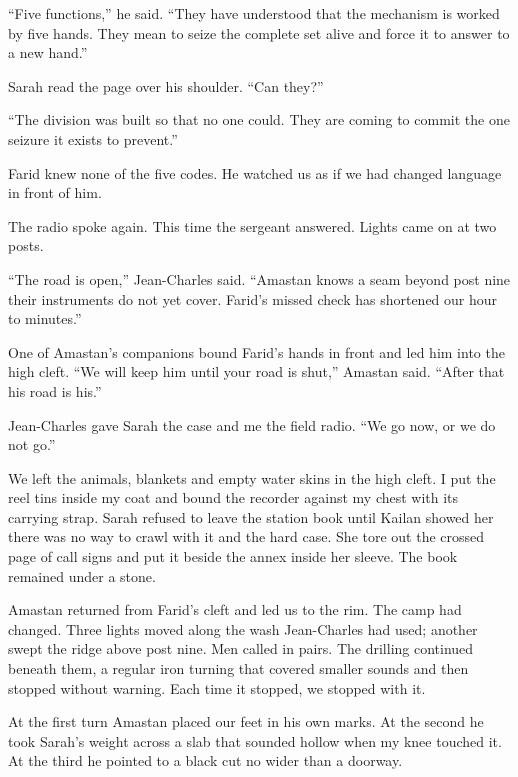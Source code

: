 ``Five functions,'' he said. ``They have understood that the mechanism is worked by five hands. They mean to seize the complete set alive and force it to answer to a new hand.''\par

Sarah read the page over his shoulder. ``Can they?''\par

``The division was built so that no one could. They are coming to commit the one seizure it exists to prevent.''\par

Farid knew none of the five codes. He watched us as if we had changed language in front of him.\par

The radio spoke again. This time the sergeant answered. Lights came on at two posts.\par

``The road is open,'' Jean-Charles said. ``Amastan knows a seam beyond post nine their instruments do not yet cover. Farid's missed check has shortened our hour to minutes.''\par

One of Amastan's companions bound Farid's hands in front and led him into the high cleft. ``We will keep him until your road is shut,'' Amastan said. ``After that his road is his.''\par

Jean-Charles gave Sarah the case and me the field radio. ``We go now, or we do not go.''\par

We left the animals, blankets and empty water skins in the high cleft. I put the reel tins inside my coat and bound the recorder against my chest with its carrying strap. Sarah refused to leave the station book until Kailan showed her there was no way to crawl with it and the hard case. She tore out the crossed page of call signs and put it beside the annex inside her sleeve. The book remained under a stone.\par

Amastan returned from Farid's cleft and led us to the rim. The camp had changed. Three lights moved along the wash Jean-Charles had used; another swept the ridge above post nine. Men called in pairs. The drilling continued beneath them, a regular iron turning that covered smaller sounds and then stopped without warning. Each time it stopped, we stopped with it.\par

At the first turn Amastan placed our feet in his own marks. At the second he took Sarah's weight across a slab that sounded hollow when my knee touched it. At the third he pointed to a black cut no wider than a doorway.\par

